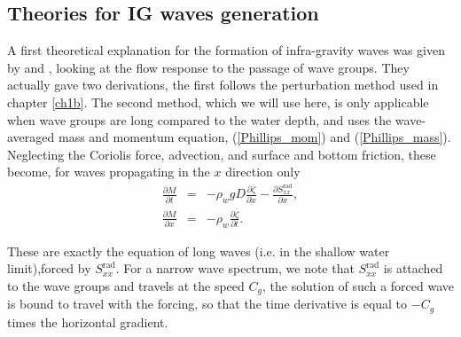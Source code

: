 \subsection{Theories for IG waves generation}
A first theoretical explanation for the formation of infra-gravity waves was given by \cite{Witham1962} and \cite{Longuet-Higgins&Stewart1962},  looking 
at the flow response to the passage of wave groups. They actually gave two derivations, the first follows the perturbation method used in chapter \ref{ch1b}. The second method, which we will use here, is only applicable when wave groups are long compared to the water depth, 
and uses the wave-averaged mass and momentum equation, (\ref{Phillips_mom}) and (\ref{Phillips_mass}). 
Neglecting 
the Coriolis force, advection, and surface and bottom friction, these become, for waves propagating in the $x$ direction only 
\begin{eqnarray}
\frac{\partial M}{\partial t}&=& - \rho_w g D \frac{\partial \overline{\zeta}}{\partial x}  - \frac{\partial S_{xx}^{\mathrm{rad}}}{\partial x},  \\
\frac{\partial M}{\partial x}&=& - \rho_w  \frac{\partial  \overline{\zeta}}{\partial t}.
\end{eqnarray}

These are exactly the equation of long waves (i.e. in the shallow water limit),forced by $S_{xx}^{\mathrm{rad}}$. For a narrow wave spectrum, we note that
$S_{xx}^{\mathrm{rad}}$ is 
attached to the wave groups and travels at the speed $C_g$, the solution of such a forced wave is bound to travel with the forcing, so that  the time 
derivative is equal to $-C_g$ times the horizontal gradient. 

